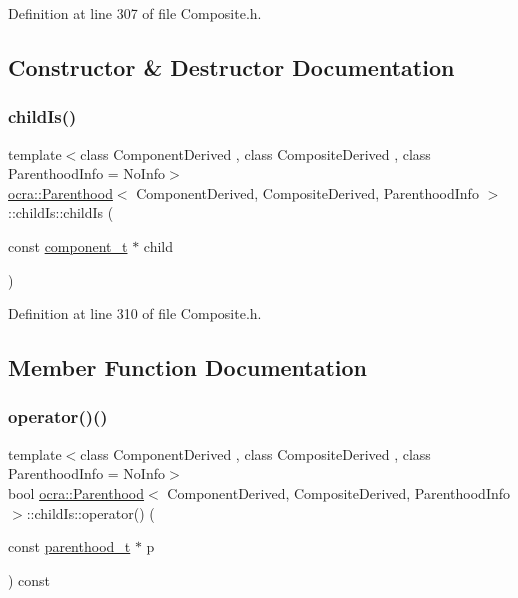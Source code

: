 Definition at line 307 of file Composite.\+h.



\subsection{Constructor \& Destructor Documentation}
\hypertarget{structocra_1_1Parenthood_1_1childIs_a19d608fdf341bf6e8c98578a5d2e5221}{}\label{structocra_1_1Parenthood_1_1childIs_a19d608fdf341bf6e8c98578a5d2e5221} 
\subsubsection{\texorpdfstring{child\+Is()}{childIs()}}
{\footnotesize\ttfamily template$<$class Component\+Derived , class Composite\+Derived , class Parenthood\+Info  = No\+Info$>$ \\
\hyperlink{classocra_1_1Parenthood}{ocra\+::\+Parenthood}$<$ Component\+Derived, Composite\+Derived, Parenthood\+Info $>$\+::child\+Is\+::child\+Is (\begin{DoxyParamCaption}\item[{const \hyperlink{classocra_1_1Parenthood_a44b601577125fe0fd1d1e5ae4f143349}{component\+\_\+t} $\ast$}]{child }\end{DoxyParamCaption})\hspace{0.3cm}{\ttfamily [inline]}}



Definition at line 310 of file Composite.\+h.



\subsection{Member Function Documentation}
\hypertarget{structocra_1_1Parenthood_1_1childIs_acc2f7b0a548c4420f5d7349c013417ba}{}\label{structocra_1_1Parenthood_1_1childIs_acc2f7b0a548c4420f5d7349c013417ba} 
\subsubsection{\texorpdfstring{operator()()}{operator()()}}
{\footnotesize\ttfamily template$<$class Component\+Derived , class Composite\+Derived , class Parenthood\+Info  = No\+Info$>$ \\
bool \hyperlink{classocra_1_1Parenthood}{ocra\+::\+Parenthood}$<$ Component\+Derived, Composite\+Derived, Parenthood\+Info $>$\+::child\+Is\+::operator() (\begin{DoxyParamCaption}\item[{const \hyperlink{classocra_1_1Parenthood_acdae20cb747190b5dc9dbe42290bde78}{parenthood\+\_\+t} $\ast$}]{p }\end{DoxyParamCaption}) const\hspace{0.3cm}{\ttfamily [inline]}}




